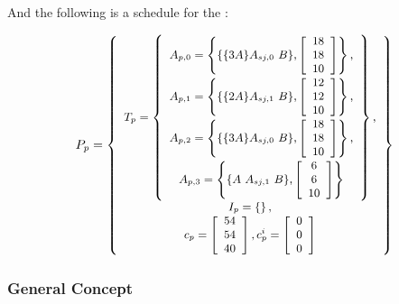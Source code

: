 \noindent And the following is a schedule for the {\pipeline}:

\begin{displaymath} \small
P_p = \left\{
\begin{array}{c}
T_p = \left\{
\begin{array}{c}
A_{p,0} = \left\{ \{\{3A\}A_{sj,0}\ B\}, \left[\begin{array}{c} 18 \\ 18 \\ 10 \end{array}\right]\right\}, \\
A_{p,1} = \left\{ \{\{2A\}A_{sj,1}\ B\}, \left[\begin{array}{c} 12 \\ 12 \\ 10 \end{array}\right]\right\}, \\
A_{p,2} = \left\{ \{\{3A\}A_{sj,0}\ B\}, \left[\begin{array}{c} 18 \\ 18 \\ 10 \end{array}\right]\right\}, \\
A_{p,3} = \left\{ \{A\ A_{sj,1}\ B\}, \left[\begin{array}{c} 6 \\ 6 \\ 10 \end{array}\right]\right\} \\
\end{array}\right\}, \\
I_p = \left\{ \right\}, \\
c_p = \left[ \begin{array}{c} 54 \\ 54 \\ 40 \end{array} \right],
c^i_p = \left[ \begin{array}{c} 0 \\ 0 \\ 0 \end{array} \right]
\end{array}
\right\}
\end{displaymath}

\subsubsection{General Concept}

